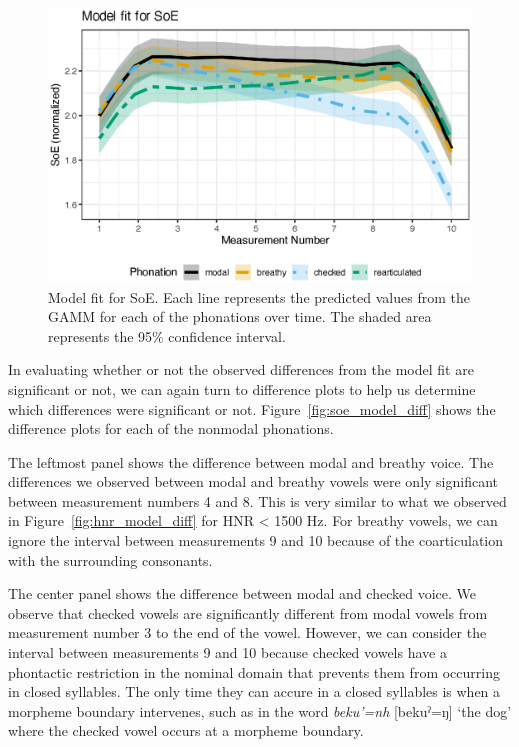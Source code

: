 \begin{figure}[h!]
    \centering
    \includegraphics[width = \linewidth]{images/LCH_GAMMs/soe_model_fit.eps}
    \caption{Model fit for SoE. Each line represents the predicted values from the GAMM for each of the phonations over time. The shaded area represents the 95\% confidence interval.}
    \label{fig:soe_model_fit}
\end{figure}

In evaluating whether or not the observed differences from the model fit are significant or not, we can again turn to difference plots to help us determine which differences were significant or not. Figure~\ref{fig:soe_model_diff} shows the difference plots for each of the nonmodal phonations. 

The leftmost panel shows the difference between modal and breathy voice. The differences we observed between modal and breathy vowels were only significant between measurement numbers 4 and 8. This is very similar to what we observed in Figure~\ref{fig:hnr_model_diff} for HNR < 1500 Hz. For breathy vowels, we can ignore the interval between measurements 9 and 10 because of the coarticulation with the surrounding consonants.

The center panel shows the difference between modal and checked voice. We observe that checked vowels are significantly different from modal vowels from measurement number 3 to the end of the vowel. However, we can consider the interval between measurements 9 and 10 because checked vowels have a phontactic restriction in the nominal domain that prevents them from occurring in closed syllables. The only time they can accure in a closed syllables is when a morpheme boundary intervenes, such as in the word \textit{beku'=nh} [bekuˀ=ŋ] `the dog' where the checked vowel occurs at a morpheme boundary. 

